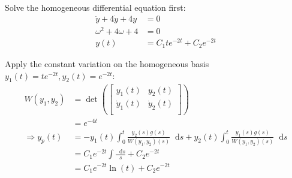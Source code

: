 \documentclass[utf8]{ctexart}
\newcommand{\dif}{\mathop{}\!\mathrm{d}}
\begin{document}
Solve the homogeneous differential equation first:
\begin{equation}
	\begin{aligned}
		\ddot{y}+4\dot{y}+4y   & =0                      \\
		\omega ^{2}+4\omega +4 & =0                      \\
		y(t)                   & =C_1te^{-2t}+C_2e^{-2t}
	\end{aligned}
\end{equation}

Apply the constant variation on the homogeneous basis \(y_1(t)=te^{-2t},y_2(t)=e^{-2t}\):
\begin{equation}
	\begin{aligned}
		W(y_1,y_2)           & =\det \left(\begin{bmatrix}
			                                   y_1(t)       & y_2(t)       \\
			                                   \dot{y}_1(t) & \dot{y}_2(t) \\
		                                   \end{bmatrix}\right)                                                          \\
		                     & =e^{-4t}                                                                                                            \\
		\Rightarrow y_{p}(t) & =-y_1(t)\int_{0}^{t}\frac{y_2(s)g(s)}{W(y_1,y_2)(s)}\dif s+y_2(t)\int_{0}^{t}\frac{y_1(s)g(s)}{W(y_1,y_2)(s)}\dif s \\
		                     & =C_1e^{-2t}\int \frac{\dif s}{s}+C_2e^{-2 t}                                                                        \\
		                     & =C_1 e^{-2 t} \ln (t)+C_2 e^{-2 t}
	\end{aligned}
\end{equation}
\end{document}
